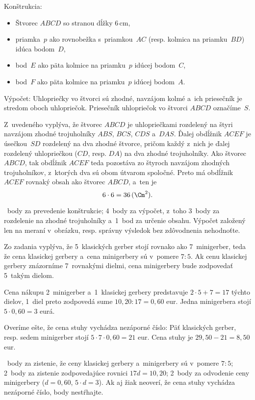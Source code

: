 {%
Konštrukcia:
\begin{itemize}
\item Štvorec $ABCD$ so stranou dĺžky 6\,cm,
\item priamka~$p$ ako rovnobežka s~priamkou~$AC$ (resp. kolmica na priamku~$BD$) idúca bodom~$D$,
\item bod~$E$ ako päta kolmice na priamku~$p$ idúcej bodom~$C$,
\item bod~$F$ ako päta kolmice na priamku~$p$ idúcej bodom~$A$.%
\end{itemize}

Výpočet:
Uhlopriečky vo štvorci sú zhodné, navzájom kolmé a~ich priesečník je stredom oboch uhlopriečok.
Priesečník uhlopriečok vo štvorci $ABCD$ označíme~$S$.

Z~uvedeného vyplýva, že štvorec $ABCD$ je uhlopriečkami rozdelený na štyri navzájom zhodné trojuholníky $ABS$, $BCS$, $CDS$ a~$DAS$.
Ďalej obdĺžnik $ACEF$ je úsečkou~$SD$ rozdelený na dva zhodné štvorce, pričom každý z~nich je ďalej rozdelený uhlopriečkou ($CD$, resp. $DA$) na dva zhodné trojuholníky.
Ako štvorec $ABCD$, tak obdĺžnik $ACEF$ teda pozostáva zo štyroch navzájom zhodných trojuholníkov, z~ktorých dva sú obom útvarom spoločné.
Preto má obdĺžnik $ACEF$ rovnaký obsah ako štvorec $ABCD$, a~ten je
$$
6\cdot6=36\,(\Cm^2).
$$

~body za prevedenie konštrukcie;
4~body za výpočet, z~toho 3~body za rozdelenie na zhodné trojuholníky a~1~bod za určenie obsahu.
Výpočet založený len na meraní v~obrázku, resp. správny výsledok bez zdôvodnenia nehodnoťte.
\endhodnotenie
}

{%
Zo zadania vyplýva, že 5~klasických gerber stojí rovnako ako 7~minigerber, teda že cena klasickej gerbery a~cena minigerbery sú v~pomere $7:5$.
Ak cenu klasickej gerbery znázorníme 7~rovnakými dielmi, cena minigerbery bude zodpovedať 5~takým dielom.

Cena nákupu 2~minigerber a~1~klasickej gerbery predstavuje $2\cdot5+7=17$ týchto dielov, 1~diel preto zodpovedá sume $10{,}20:17=0{,}60$ eur.
Jedna minigerbera stojí $5\cdot0{,}60 = 3$ eurá.

Overíme ešte, že cena stuhy vychádza nezáporné číslo: Päť klasických gerber, resp. sedem minigerber stojí $5\cdot7\cdot0{,}60=21$ eur.
Cena stuhy je $29{,}50-21=8{,}50$ eur.

~body za zistenie, že ceny klasickej gerbery a~minigerbery sú v~pomere $7:5$;
2~body za zistenie zodpovedajúce rovnici $17d=10,20$;
2~body za odvodenie ceny minigerbery ($d=0{,}60$, ${5\cdot d}=3$).
Ak aj žiak neoverí, že cena stuhy vychádza nezáporné číslo, body nestŕhajte.
\endhodnotenie
}

